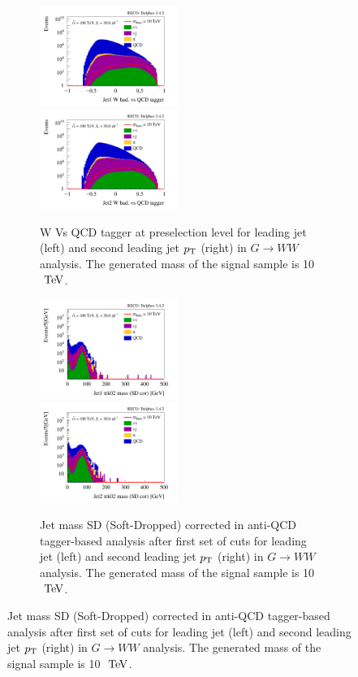 \documentclass{cernrep}
\begin{document}
\begin{figure}[!htb]
\begin{figure}[!htb]\centering
\includegraphics[width=0.495\textwidth]{Fig/RSGww/tagger/Jet1_Whad_vs_QCD_tagger_sel0_nostack_log.png}
\includegraphics[width=0.495\textwidth]{Fig/RSGww/tagger/Jet2_Whad_vs_QCD_tagger_sel0_nostack_log.png}
\caption{W Vs QCD tagger at preselection level for leading jet (left) and second leading jet $p\sb{\scriptstyle\mathrm{T}}$ (right) in $G \rightarrow WW$ analysis. The generated mass of the signal sample is 10 $\TeV$.}
\label{fig:RSGww_sel0_tagger}
\end{figure}

\begin{figure}[!htb]\centering
\includegraphics[width=0.495\textwidth]{Fig/RSGww/tagger/Jet1_trk02_SD_Cor_m_sel1_nostack_log.png}
\includegraphics[width=0.495\textwidth]{Fig/RSGww/tagger/Jet2_trk02_SD_Cor_m_sel1_nostack_log.png}
\caption{Jet mass SD (Soft-Dropped) corrected in anti-QCD tagger-based analysis after first set of cuts for leading jet (left) and second leading jet $p\sb{\scriptstyle\mathrm{T}}$ (right) in $G \rightarrow WW$ analysis. The generated mass of the signal sample is 10 $\TeV$.}
\label{fig:RSGww_sel1_tagger}
\end{figure}


\end{figure}
\end{document}
